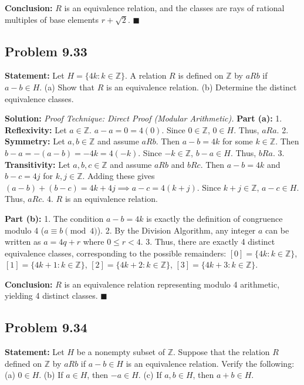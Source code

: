 \documentclass[11pt, a4paper]{article}
\theoremstyle{definition}
\theoremstyle{remark}
\newcommand{\Z}{\mathbb{Z}}
\begin{document}
\textbf{Conclusion:} $R$ is an equivalence relation, and the classes are rays of rational multiples of base elements $r + \sqrt{2}$. $\blacksquare$

\subsection{Problem 9.33}
\textbf{Statement:} Let $H = \{4k : k \in \Z\}$. A relation $R$ is defined on $\Z$ by $a R b$ if $a - b \in H$. (a) Show that $R$ is an equivalence relation. (b) Determine the distinct equivalence classes.

\textbf{Solution:}
\textit{Proof Technique: Direct Proof (Modular Arithmetic).}
\textbf{Part (a):}
1. \textbf{Reflexivity:} Let $a \in \Z$. $a - a = 0 = 4(0)$. Since $0 \in \Z$, $0 \in H$. Thus, $a R a$.
2. \textbf{Symmetry:} Let $a, b \in \Z$ and assume $a R b$. Then $a - b = 4k$ for some $k \in \Z$. Then $b - a = -(a - b) = -4k = 4(-k)$. Since $-k \in \Z$, $b - a \in H$. Thus, $b R a$.
3. \textbf{Transitivity:} Let $a, b, c \in \Z$ and assume $a R b$ and $b R c$. Then $a - b = 4k$ and $b - c = 4j$ for $k, j \in \Z$. Adding these gives $(a - b) + (b - c) = 4k + 4j \implies a - c = 4(k + j)$. Since $k+j \in \Z$, $a - c \in H$. Thus, $a R c$.
4. $R$ is an equivalence relation.

\textbf{Part (b):}
1. The condition $a - b = 4k$ is exactly the definition of congruence modulo 4 ($a \equiv b \pmod 4$).
2. By the Division Algorithm, any integer $a$ can be written as $a = 4q + r$ where $0 \le r < 4$.
3. Thus, there are exactly 4 distinct equivalence classes, corresponding to the possible remainders:
   $[0] = \{4k : k \in \Z\}$, $[1] = \{4k + 1 : k \in \Z\}$, $[2] = \{4k + 2 : k \in \Z\}$, $[3] = \{4k + 3 : k \in \Z\}$.

\textbf{Conclusion:} $R$ is an equivalence relation representing modulo 4 arithmetic, yielding 4 distinct classes. $\blacksquare$

\subsection{Problem 9.34}
\textbf{Statement:} Let $H$ be a nonempty subset of $\Z$. Suppose that the relation $R$ defined on $\Z$ by $a R b$ if $a - b \in H$ is an equivalence relation. Verify the following: (a) $0 \in H$. (b) If $a \in H$, then $-a \in H$. (c) If $a, b \in H$, then $a + b \in H$.
\end{document}
